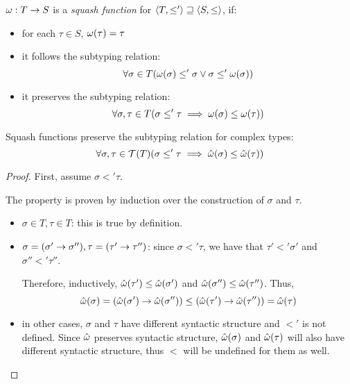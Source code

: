 \documentclass[main.tex]{subfiles}
\begin{document}
\begin{defn}\label{def:squashfn}
    $\omega: T \rightarrow S$ is a \emph{squash function} for
    $\langle  T,  \leq'  \rangle \sqsupseteq \langle  S,  \leq  \rangle$, if:
    \begin{itemize}
        \item for each $\tau \in S$, $\omega(\tau) = \tau$
        \item it follows the subtyping relation:
            \[ \forall \sigma \in T
                (\omega(\sigma) \leq' \sigma \lor \sigma \leq' \omega(\sigma)) \]
        \item it preserves the subtyping relation:
            \[ \forall \sigma, \tau \in T (\sigma \leq' \tau \implies
                \omega(\sigma) \leq \omega(\tau)) \]
    \end{itemize}
\end{defn}

\begin{property}
    \label{prop:squash:preserve}
    Squash functions preserve the subtyping relation for complex types:
    \[ \forall \sigma, \tau \in \mathcal{T}( T ) (\sigma \leq' \tau \implies
        \hat{\omega}(\sigma) \leq \hat{\omega}(\tau)) \]
\end{property}
\begin{proof}
    First, assume $\sigma \less' \tau$.

    The property is proven by induction over the construction of $\sigma$
    and $\tau$.

    \begin{itemize}
        \item $\sigma \in T, \tau \in T$: this is true by definition.
        \item $\sigma = (\sigma' \rightarrow \sigma''), \tau = (\tau' \rightarrow \tau'')$:
            since $\sigma \less' \tau$, we have that $\tau' \less' \sigma'$
            and $\sigma'' \less' \tau''$.

            Therefore, inductively, $\hat{\omega}(\tau') \leq \hat{\omega}(\sigma')$
            and $\hat{\omega}(\sigma'') \leq \hat{\omega}(\tau'')$. Thus,
            \[
                \hat{\omega}(\sigma) = (\hat{\omega}(\sigma') \rightarrow \hat{\omega}(\sigma''))
                \leq
                (\hat{\omega}(\tau') \rightarrow \hat{\omega}(\tau'')) = \hat{\omega}(\tau)
            \]
        \item in other cases, $\sigma$ and $\tau$ have different syntactic
            structure and $\less'$ is not defined. Since $\hat{\omega}$ preserves
            syntactic structure, $\hat{\omega}(\sigma)$ and $\hat{\omega}(\tau)$
            will also have different syntactic structure, thus $\less$ will
            be undefined for them as well.
    \end{itemize}
\end{proof}
\end{document}
